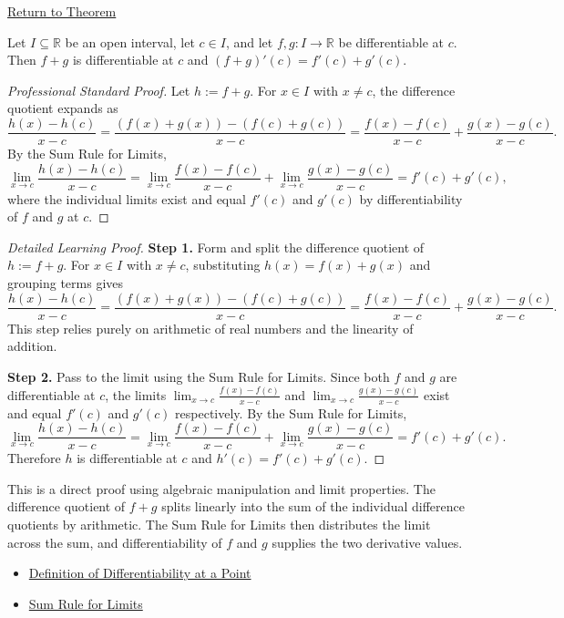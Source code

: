 \newpage
{}
\label{prf:sum-rule}

\begin{remark*}[Return]
\hyperref[thm:sum-rule]{Return to Theorem}
\end{remark*}

\begin{theorem*}
Let $I \subseteq \mathbb{R}$ be an open interval, let $c \in I$, and let $f, g : I \to \mathbb{R}$ be differentiable at $c$. Then $f + g$ is differentiable at $c$ and $(f + g)'(c) = f'(c) + g'(c)$.
\end{theorem*}

\begin{proof}[Professional Standard Proof]
\LRAProofBodyStart
Let $h := f + g$. For $x \in I$ with $x \neq c$, the difference quotient expands as
\[
  \frac{h(x) - h(c)}{x - c} = \frac{(f(x) + g(x)) - (f(c) + g(c))}{x - c} = \frac{f(x) - f(c)}{x - c} + \frac{g(x) - g(c)}{x - c}.
\]
By the Sum Rule for Limits,
\[
  \lim_{x \to c} \frac{h(x) - h(c)}{x - c} = \lim_{x \to c} \frac{f(x) - f(c)}{x - c} + \lim_{x \to c} \frac{g(x) - g(c)}{x - c} = f'(c) + g'(c),
\]
where the individual limits exist and equal $f'(c)$ and $g'(c)$ by differentiability of $f$ and $g$ at $c$.
\end{proof}

\begin{proof}[Detailed Learning Proof]
\LRAProofBodyStart

\textbf{Step 1.} Form and split the difference quotient of $h := f + g$. For $x \in I$ with $x \neq c$, substituting $h(x) = f(x) + g(x)$ and grouping terms gives
\[
  \frac{h(x) - h(c)}{x - c} = \frac{(f(x) + g(x)) - (f(c) + g(c))}{x - c} = \frac{f(x) - f(c)}{x - c} + \frac{g(x) - g(c)}{x - c}.
\]
This step relies purely on arithmetic of real numbers and the linearity of addition.

\textbf{Step 2.} Pass to the limit using the Sum Rule for Limits. Since both $f$ and $g$ are differentiable at $c$, the limits $\lim_{x \to c} \frac{f(x) - f(c)}{x - c}$ and $\lim_{x \to c} \frac{g(x) - g(c)}{x - c}$ exist and equal $f'(c)$ and $g'(c)$ respectively. By the Sum Rule for Limits,
\[
  \lim_{x \to c} \frac{h(x) - h(c)}{x - c} = \lim_{x \to c} \frac{f(x) - f(c)}{x - c} + \lim_{x \to c} \frac{g(x) - g(c)}{x - c} = f'(c) + g'(c).
\]
Therefore $h$ is differentiable at $c$ and $h'(c) = f'(c) + g'(c)$.
\end{proof}

\begin{remark*}
This is a direct proof using algebraic manipulation and limit properties. The difference quotient of $f + g$ splits linearly into the sum of the individual difference quotients by arithmetic. The Sum Rule for Limits then distributes the limit across the sum, and differentiability of $f$ and $g$ supplies the two derivative values.
\end{remark*}

\begin{dependencies}
\begin{itemize}
  \item \hyperref[def:derivative-at-a-point]{Definition of Differentiability at a Point}
  \item \hyperref[thm:limit-sum]{Sum Rule for Limits}
\end{itemize}
\end{dependencies}

\clearpage
